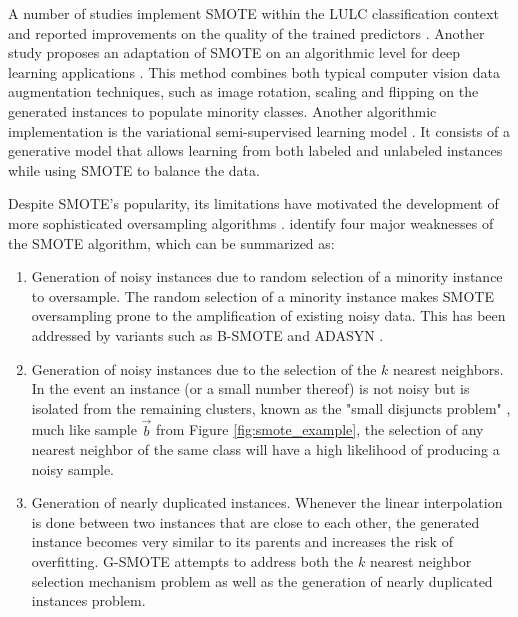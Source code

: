 \documentclass[information,article,submit,moreauthors,pdftex]{Definitions/mdpi}
\begin{document}
\begin{paracol}{2}
\linenumbers
\switchcolumn

A number of studies implement SMOTE within the LULC classification context and
reported improvements on the quality of the trained predictors
\citep{Jozdani2019, Bogner2018}. Another study proposes an adaptation of SMOTE
on an algorithmic level for deep learning applications \citep{Zhu2020}. This
method combines both typical computer vision data augmentation techniques,
such as image rotation, scaling and flipping on the generated instances to
populate minority classes. Another algorithmic implementation is the
variational semi-supervised learning model \citep{Cenggoro2018}. It consists of
a generative model that allows learning from both labeled and unlabeled
instances while using SMOTE to balance the data.

Despite SMOTE's popularity, its limitations have motivated the development of
more sophisticated oversampling algorithms \citep{Douzas2019, Han2005, Ma2017,
Douzas2017, Douzas2018, HaiboHe2008}. \cite{Douzas2019} identify four major
weaknesses of the SMOTE algorithm, which can be summarized as:

\begin{enumerate}
    \item Generation of noisy instances due to random selection of a
        minority instance to oversample. The random
        selection of a minority instance makes SMOTE
        oversampling prone to the amplification of existing noisy data. This
        has been addressed by variants such as B-SMOTE \citep{Han2005} and
        ADASYN \citep{HaiboHe2008}. 

    \item Generation of noisy instances due to the selection of the $k$
        nearest neighbors. In the event an instance
        (or a small number thereof) is not noisy but is isolated from the
        remaining clusters, known as the "small disjuncts problem"
        \citep{holte1989}, much like sample $\overrightarrow{b}$ from Figure
        \ref{fig:smote_example}, the selection of any nearest neighbor of the
        same class will have a high likelihood of producing a noisy sample.

    \item Generation of nearly duplicated instances. Whenever the linear
        interpolation is done between two instances that are close to each
        other, the generated instance becomes very similar to its parents and
        increases the risk of overfitting. G-SMOTE \citep{Douzas2019} attempts
        to address both the $k$ nearest neighbor selection mechanism problem
        as well as the generation of nearly duplicated instances problem. 


\end{enumerate}
\end{paracol}
\end{document}
